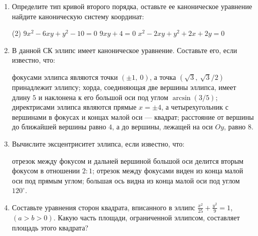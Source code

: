\begin{enumerate}
    \item Определите тип кривой второго порядка, оставьте ее каноническое уравнение  найдите каноническую систему координат:
   		\begin{tasks}(2)
   			\task $9x^2 - 6xy +y^2 -10 = 0$
   			\task $9xy + 4 = 0$
   			\task $x^2 -2xy +y^2 +2x+2y=0$
   		\end{tasks}
   	\item В данной СК эллипс имеет каноническое уравнение. Составьте его, если известно, что:
   	\begin{tasks}
   		\task фокусами эллипса являются точки $(\pm 1,\ 0)$, а точка $(\sqrt{3},\ \sqrt{3}/2)$ принадлежит эллипсу;
   		\task хорда, соединяющая две вершины эллипса, имеет длину $5$ и наклонена к его большой оси под углом $\arcsin (3/5)$;
   		\task директрисами эллипса являются прямые $x=\pm4$, а четырехугольник с вершинами в фокусах и концах малой оси --- квадрат;
   		\task расстояние от вершины до ближайшей вершины равно $4$, а до вершины, лежащей на оси $Oy$, равно 8.	
   	\end{tasks}

	\item Вычислите эксцентриситет эллипса, если известно, что:
	\begin{tasks}
		\task отрезок между фокусом и дальней вершиной большой оси делится вторым фокусом в отношении $2:1$;
		\task отрезок между фокусами виден из конца малой оси под прямым углом;
		\task большая ось видна из конца малой оси под углом $120^\circ$.
	\end{tasks}
	
	\item Составьте уравнения сторон квадрата, вписанного в эллипс $\frac{x^2}{25} + \frac{y^2}{9} = 1$, ${(a>b>0)}$. Какую часть площади, ограниченной эллипсом, составляет площадь этого квадрата?
\end{enumerate}